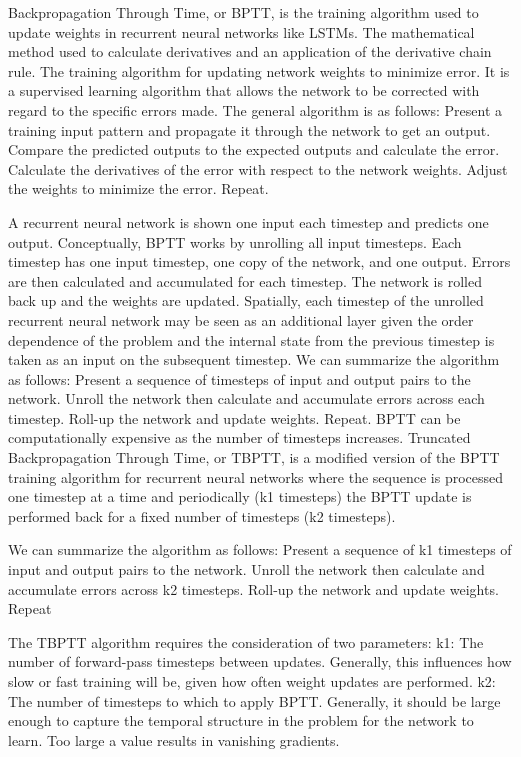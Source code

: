 Backpropagation Through Time, or BPTT, is the training algorithm used to update weights in recurrent neural networks like LSTMs.
The mathematical method used to calculate derivatives and an application of the derivative chain rule.
The training algorithm for updating network weights to minimize error.
It is a supervised learning algorithm that allows the network to be corrected with regard to the specific errors made.
The general algorithm is as follows:
    Present a training input pattern and propagate it through the network to get an output.
    Compare the predicted outputs to the expected outputs and calculate the error.
    Calculate the derivatives of the error with respect to the network weights.
    Adjust the weights to minimize the error.
    Repeat.

A recurrent neural network is shown one input each timestep and predicts one output.
Conceptually, BPTT works by unrolling all input timesteps. Each timestep has one input timestep, one copy of the network, and one output. Errors are then calculated and accumulated for each timestep. The network is rolled back up and the weights are updated.
Spatially, each timestep of the unrolled recurrent neural network may be seen as an additional layer given the order dependence of the problem and the internal state from the previous timestep is taken as an input on the subsequent timestep.
We can summarize the algorithm as follows:
    Present a sequence of timesteps of input and output pairs to the network.
    Unroll the network then calculate and accumulate errors across each timestep.
    Roll-up the network and update weights.
    Repeat.
BPTT can be computationally expensive as the number of timesteps increases.
Truncated Backpropagation Through Time, or TBPTT, is a modified version of the BPTT training algorithm for recurrent neural networks where the sequence is processed one timestep at a time and periodically (k1 timesteps) the BPTT update is performed back for a fixed number of timesteps (k2 timesteps).

We can summarize the algorithm as follows:
    Present a sequence of k1 timesteps of input and output pairs to the network.
    Unroll the network then calculate and accumulate errors across k2 timesteps.
    Roll-up the network and update weights.
    Repeat

The TBPTT algorithm requires the consideration of two parameters:
    k1: The number of forward-pass timesteps between updates. Generally, this influences how slow or fast training will be, given how often weight updates are performed.
    k2: The number of timesteps to which to apply BPTT. Generally, it should be large enough to capture the temporal structure in the problem for the network to learn. Too large a value results in vanishing gradients.

